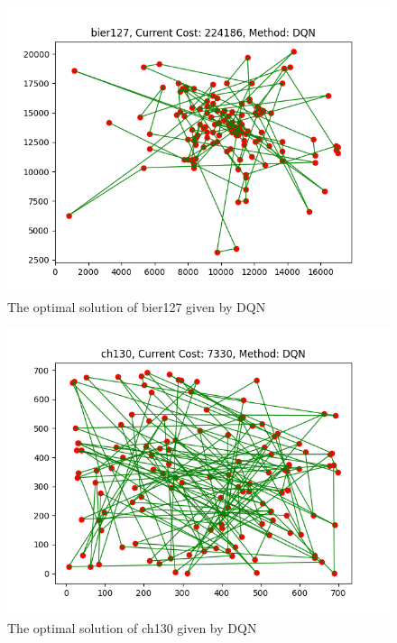 \documentclass[twocolumn, a4paper]{extarticle}
\begin{document}
\begin{figure}[H]
	\centering
	\includegraphics[width=0.95\linewidth]{figure/DQN_bier127}
	\caption{The optimal solution of bier127 given by DQN}
	\label{fig:DQNbier127}
\end{figure}

\begin{figure}[H]
	\centering
	\includegraphics[width=0.95\linewidth]{figure/DQN_ch130}
	\caption{The optimal solution of ch130 given by DQN}
	\label{fig:DQNch130}
\end{figure}
\end{document}
